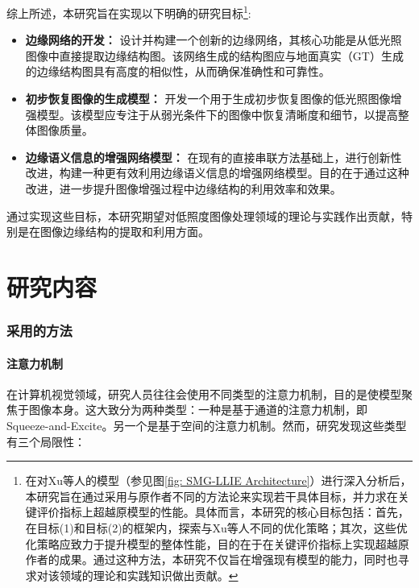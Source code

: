 \documentclass[a4paper]{ctexart}
\begin{document}
	综上所述，本研究旨在实现以下明确的研究目标\footnote{在对Xu等人\cite{xu2023low}的模型（参见图\ref{fig: SMG-LLIE Architecture}）进行深入分析后，本研究旨在通过采用与原作者不同的方法论来实现若干具体目标，并力求在关键评价指标上超越原模型的性能。具体而言，本研究的核心目标包括：首先，在目标(1)和目标(2)的框架内，探索与Xu等人不同的优化策略；其次，这些优化策略应致力于提升模型的整体性能，目的在于在关键评价指标上实现超越原作者的成果。通过这种方法，本研究不仅旨在增强现有模型的能力，同时也寻求对该领域的理论和实践知识做出贡献。}:
	
	\begin{itemize}
		\item [(1)] \textbf{边缘网络的开发：} 设计并构建一个创新的边缘网络，其核心功能是从低光照图像中直接提取边缘结构图。该网络生成的结构图应与地面真实（GT）生成的边缘结构图具有高度的相似性，从而确保准确性和可靠性。
		
		\item [(2)] \textbf{初步恢复图像的生成模型：} 开发一个用于生成初步恢复图像的低光照图像增强模型。该模型应专注于从弱光条件下的图像中恢复清晰度和细节，以提高整体图像质量。
		
		\item [(2)] \textbf{边缘语义信息的增强网络模型：} 在现有的直接串联方法基础上，进行创新性改进，构建一种更有效利用边缘语义信息的增强网络模型。目的在于通过这种改进，进一步提升图像增强过程中边缘结构的利用效率和效果。
	\end{itemize}
	
	通过实现这些目标，本研究期望对低照度图像处理领域的理论与实践作出贡献，特别是在图像边缘结构的提取和利用方面。
	
	\part*{研究内容}
	
	\section{采用的方法}

	\subsection{注意力机制}
	
	在计算机视觉领域，研究人员往往会使用不同类型的注意力机制，目的是使模型聚焦于图像本身。这大致分为两种类型：一种是基于通道的注意力机制，即 Squeeze-and-Excite。另一个是基于空间的注意力机制\cite{woo2018cbam}。然而，研究发现这些类型有三个局限性：
	
\end{document}

